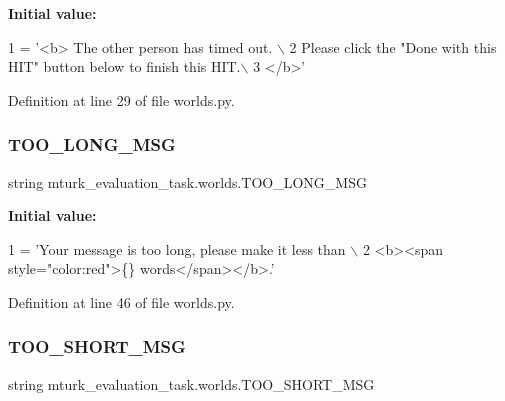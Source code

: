 {\bfseries Initial value\+:}
\begin{DoxyCode}
1 =  \textcolor{stringliteral}{'<b> The other person has timed out. \(\backslash\)}
2 \textcolor{stringliteral}{        Please click the "Done with this HIT" button below to finish this HIT.\(\backslash\)}
3 \textcolor{stringliteral}{        </b>'}
\end{DoxyCode}


Definition at line 29 of file worlds.\+py.

\mbox{\label{namespacemturk__evaluation__task_1_1worlds_a97f4c882bd571dbdc5225fbde6b17926}} 
\subsubsection{\texorpdfstring{T\+O\+O\+\_\+\+L\+O\+N\+G\+\_\+\+M\+SG}{TOO\_LONG\_MSG}}
{\footnotesize\ttfamily string mturk\+\_\+evaluation\+\_\+task.\+worlds.\+T\+O\+O\+\_\+\+L\+O\+N\+G\+\_\+\+M\+SG}

{\bfseries Initial value\+:}
\begin{DoxyCode}
1 =  \textcolor{stringliteral}{'Your message is too long, please make it less than \(\backslash\)}
2 \textcolor{stringliteral}{        <b><span style="color:red">\{\} words</span></b>.'}
\end{DoxyCode}


Definition at line 46 of file worlds.\+py.

\mbox{\label{namespacemturk__evaluation__task_1_1worlds_a416d67f0648299b9cc17258469f2a92d}} 
\subsubsection{\texorpdfstring{T\+O\+O\+\_\+\+S\+H\+O\+R\+T\+\_\+\+M\+SG}{TOO\_SHORT\_MSG}}
{\footnotesize\ttfamily string mturk\+\_\+evaluation\+\_\+task.\+worlds.\+T\+O\+O\+\_\+\+S\+H\+O\+R\+T\+\_\+\+M\+SG}

